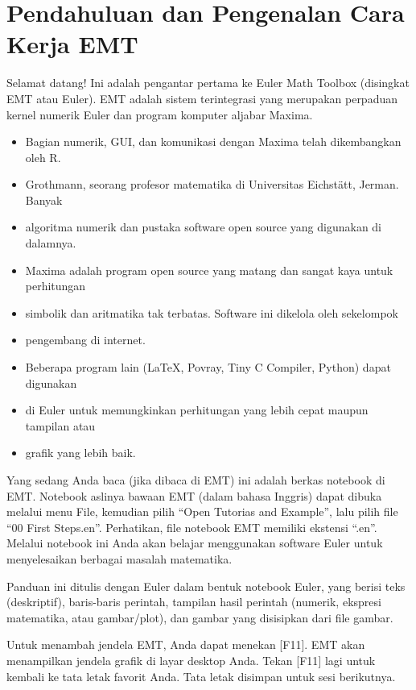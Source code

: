 \documentclass[
]{book}
\author{}
\date{}
\begin{document}
\frontmatter

\mainmatter
\chapter{Pendahuluan dan Pengenalan Cara Kerja EMT}\label{pendahuluan-dan-pengenalan-cara-kerja-emt}

Selamat datang! Ini adalah pengantar pertama ke Euler Math Toolbox (disingkat EMT atau Euler). EMT adalah sistem terintegrasi yang merupakan perpaduan kernel numerik Euler dan program komputer aljabar Maxima.

\begin{itemize}
\item
  Bagian numerik, GUI, dan komunikasi dengan Maxima telah dikembangkan oleh R.
\item
  Grothmann, seorang profesor matematika di Universitas Eichstätt, Jerman. Banyak
\item
  algoritma numerik dan pustaka software open source yang digunakan di dalamnya.
\item
  Maxima adalah program open source yang matang dan sangat kaya untuk perhitungan
\item
  simbolik dan aritmatika tak terbatas. Software ini dikelola oleh sekelompok
\item
  pengembang di internet.
\item
  Beberapa program lain (LaTeX, Povray, Tiny C Compiler, Python) dapat digunakan
\item
  di Euler untuk memungkinkan perhitungan yang lebih cepat maupun tampilan atau
\item
  grafik yang lebih baik.
\end{itemize}

Yang sedang Anda baca (jika dibaca di EMT) ini adalah berkas notebook di EMT. Notebook aslinya bawaan EMT (dalam bahasa Inggris) dapat dibuka melalui menu File, kemudian pilih ``Open Tutorias and Example'', lalu pilih file ``00 First Steps.en''. Perhatikan, file notebook EMT memiliki ekstensi ``.en''. Melalui notebook ini Anda akan belajar menggunakan software Euler untuk menyelesaikan berbagai masalah matematika.

Panduan ini ditulis dengan Euler dalam bentuk notebook Euler, yang berisi teks (deskriptif), baris-baris perintah, tampilan hasil perintah (numerik, ekspresi matematika, atau gambar/plot), dan gambar yang disisipkan dari file gambar.

Untuk menambah jendela EMT, Anda dapat menekan {[}F11{]}. EMT akan menampilkan jendela grafik di layar desktop Anda. Tekan {[}F11{]} lagi untuk kembali ke tata letak favorit Anda. Tata letak disimpan untuk sesi berikutnya.
\end{document}

